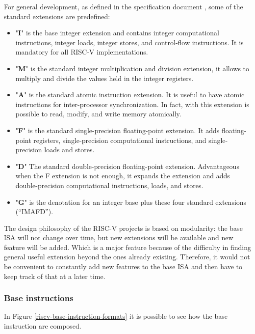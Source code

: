 For general development, as defined in the specification document \cite{riscv-v-specs}, some of the standard extensions are predefined:
\begin{itemize}
    \item "\textbf{I}" is the base integer extension and contains integer computational instructions, integer loads, integer stores, and control-ﬂow instructions. It is mandatory for all RISC-V implementations.
    
    \item "\textbf{M}" is the standard integer multiplication and division extension, it allows to multiply and divide the values held in the integer registers.
    
    \item "\textbf{A}" is the standard atomic instruction extension. It is useful to have atomic instructions for inter-processor synchronization. In fact, with this extension is possible to read, modify, and write memory atomically. 
    
    \item "\textbf{F}" is the standard single-precision ﬂoating-point extension. It adds ﬂoating-point registers, single-precision computational instructions, and single-precision loads and stores. 
    
    \item "\textbf{D}" The standard double-precision ﬂoating-point extension. Advantageous when the F extension is not enough, it expands the extension and adds double-precision computational instructions, loads, and stores.
    
    \item "\textbf{G}" is the denotation for an integer base plus these four standard extensions (“IMAFD”).
\end{itemize}


The design philosophy of the RISC-V projects is based on modularity: the base ISA will not change over time, but new extensions will be available and new feature will be added. Which is a major feature because of the difficulty in finding general useful extension beyond the ones already existing. Therefore, it would not be convenient to constantly add new features to the base ISA and then have to keep track of that at a later time.


\subsubsection{Base instructions}
In Figure \ref{riscv-base-instruction-formats} it is possible to see how the base instruction are composed.

